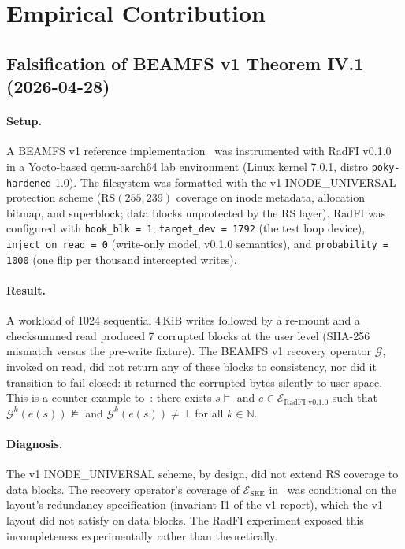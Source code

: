 \section{Empirical Contribution}\label{sec:empirical}

\subsection{Falsification of BEAMFS v1 Theorem IV.1 (2026-04-28)}\label{ssec:falsification}

\paragraph{Setup.}
A BEAMFS v1 reference implementation~\cite{desbrieres2026beamfsv1}
was instrumented with RadFI v0.1.0 in a Yocto-based qemu-aarch64 lab
environment (Linux kernel 7.0.1, distro \texttt{poky-hardened} 1.0).
The filesystem was formatted with the v1 INODE\_UNIVERSAL protection
scheme (\(\mathrm{RS}(255,239)\) coverage on inode metadata,
allocation bitmap, and superblock; data blocks unprotected by the RS
layer). RadFI was configured with \texttt{hook\_blk = 1},
\texttt{target\_dev = 1792} (the test loop device),
\texttt{inject\_on\_read = 0} (write-only model, v0.1.0 semantics),
and \texttt{probability = 1000} (one flip per thousand intercepted
writes).

\paragraph{Result.}
A workload of 1024 sequential 4\,KiB writes followed by a re-mount
and a checksummed read produced 7 corrupted blocks at the user level
(SHA-256 mismatch versus the pre-write fixture). The BEAMFS v1
recovery operator \(\mathcal{G}\), invoked on read, did not return
any of these blocks to consistency, nor did it transition to
fail-closed: it returned the corrupted bytes silently to user space.
This is a counter-example
to~\cite[Theorem~IV.1]{desbrieres2026beamfsv1}: there exists
\(s \models\) and \(e \in \mathcal{E}_{\text{RadFI v0.1.0}}\) such
that \(\mathcal{G}^k(e(s)) \not\models\) and
\(\mathcal{G}^k(e(s)) \neq \bot\) for all \(k \in \mathbb{N}\).

\paragraph{Diagnosis.}
The v1 INODE\_UNIVERSAL scheme, by design, did not extend RS
coverage to data blocks. The recovery operator's coverage of
\(\mathcal{E}_{\text{SEE}}\)
in~\cite[Theorem~IV.1]{desbrieres2026beamfsv1} was conditional on
the layout's redundancy specification (invariant I1 of the v1
report), which the v1 layout did not satisfy on data blocks. The
RadFI experiment exposed this incompleteness experimentally rather
than theoretically.

